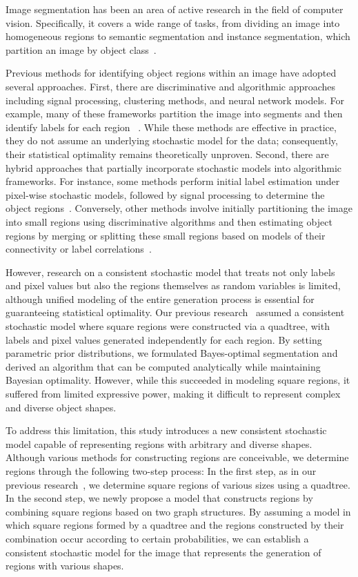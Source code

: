 \documentclass[conference]{IEEEtran}
\theoremstyle{definition}
\begin{document}
Image segmentation has been an area of active research in the field of computer vision. 
Specifically, it covers a wide range of tasks, from dividing an image into homogeneous regions to semantic segmentation and instance segmentation, which partition an image by object class~\cite{Minaee_survey}. 

Previous methods for identifying object regions within an image have adopted several approaches. 
First, there are discriminative and algorithmic approaches including signal processing, clustering methods, and neural network models. 
For example, many of these frameworks partition the image into segments \cite{Uijlings_SelectiveSearch} and then identify labels for each region 
~\cite{Tsai_fourier, Long_CNN}. 
While these methods are effective in practice, they do not assume an underlying stochastic model for the data; consequently, their statistical optimality remains theoretically unproven.
Second, there are hybrid approaches that partially incorporate stochastic models into algorithmic frameworks.
For instance, some methods perform initial label estimation under pixel-wise stochastic models, followed by signal processing to determine the object regions~\cite{Carson_Blobworld, Zhang_MRF}. 
Conversely, other methods involve initially partitioning the image into small regions using discriminative algorithms and then estimating object regions by merging or splitting these small regions based on models of their connectivity or label correlations~\cite{Yao_OMRF, Zheng_OMRF, ghosh_ddCRP}. 

However, research on a consistent stochastic model that treats not only labels and pixel values but also the regions themselves as random variables is limited, although unified modeling of the entire generation process is essential for guaranteeing statistical optimality.
Our previous research~\cite{wang_isita2024} assumed a consistent stochastic model where square regions were constructed via a quadtree, with labels and pixel values generated independently for each region. 
By setting parametric prior distributions, we formulated Bayes-optimal segmentation and derived an algorithm that can be computed analytically while maintaining Bayesian optimality. 
However, while this succeeded in modeling square regions, it suffered from limited expressive power, making it difficult to represent complex and diverse object shapes.

To address this limitation, this study introduces a new consistent stochastic model capable of representing regions with arbitrary and diverse shapes. 
Although various methods for constructing regions are conceivable, we determine regions through the following two-step process: 
In the first step, as in our previous research~\cite{wang_isita2024}, we determine square regions of various sizes using a quadtree. 
In the second step, we newly propose a model that constructs regions by combining square regions based on two graph structures. 
By assuming a model in which square regions formed by a quadtree and the regions constructed by their combination occur according to certain probabilities, we can establish a consistent stochastic model for the image that represents the generation of regions with various shapes.
\end{document}
